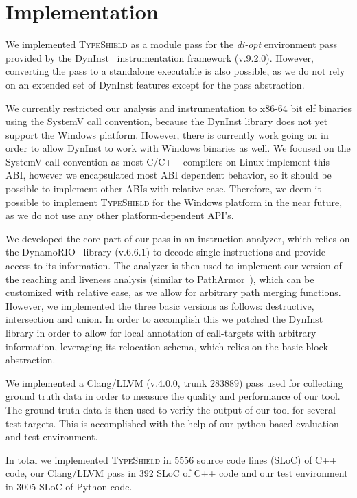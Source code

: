 \section{Implementation}
\label{chapter:Implementation}

We implemented \textsc{TypeShield} as a module pass for the \textit{di-opt} environment pass provided by the 
DynInst~\cite{bernat:dyninst} instrumentation framework (v.9.2.0). 
However, converting the pass to a standalone executable is also possible, as we do not rely on an extended set of DynInst features
except for the pass abstraction.

We currently restricted our analysis and instrumentation to x86-64 bit elf 
binaries using the SystemV call convention, because the DynInst library does not yet support the
Windows platform. However, there is currently work going on in order to allow DynInst to work with
Windows binaries as well. We focused on the SystemV call convention as most C/C++ compilers
on Linux implement this ABI, however we encapsulated most ABI dependent behavior, so it should 
be possible to implement other ABIs with relative ease. Therefore, we deem it possible to implement
\textsc{TypeShield} for the Windows platform in the near future, as we do not use any other 
platform-dependent API's. 

We developed the core part of our pass in an instruction analyzer, which relies on the DynamoRIO~\cite{dynamorio:drmemory} library 
(v.6.6.1) to decode single instructions and provide access to its information. The analyzer is then
used to implement our version of the reaching and liveness analysis (similar to PathArmor~\cite{veen:typearmor}), which can
be customized with relative ease, as we allow for arbitrary path merging functions. However, we implemented 
the three basic versions as follows: destructive, intersection and union.
In order to accomplish this we patched the DynInst library in order to allow for local annotation of call-targets with arbitrary
information, leveraging its relocation schema, which relies on the basic block abstraction.

We implemented a Clang/LLVM (v.4.0.0, trunk 283889) pass used for 
collecting ground truth data in order to measure the quality and performance of our tool. 
The ground truth data is then used to verify the output of our tool for several test targets. 
This is accomplished with the help of our python based evaluation and test environment.

In total we implemented \textsc{TypeShield} in 5556 source code lines (SLoC) of C++ code, our Clang/LLVM pass in 392 SLoC
of C++ code and our test environment in 3005 SLoC of Python code. 


